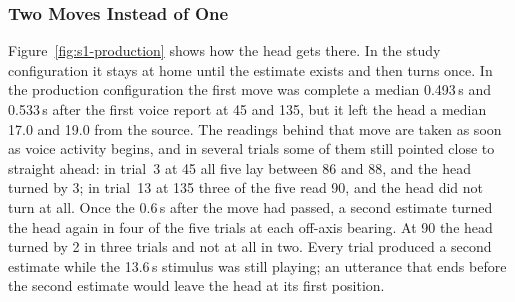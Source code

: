 \subsubsection{Two Moves Instead of One}

Figure~\ref{fig:s1-production} shows how the head gets there. In the study
configuration it stays at home until the estimate exists and then turns once.
In the production configuration the first move was complete a median 0.493\,s
and 0.533\,s after the first voice report at 45\textdegree{} and
135\textdegree{}, but it left the head a median 17.0\textdegree{} and
19.0\textdegree{} from the source. The readings behind that move are taken as
soon as voice activity begins, and in several trials some of them still pointed
close to straight ahead: in trial~3 at 45\textdegree{} all five lay between
86\textdegree{} and 88\textdegree{}, and the head turned by 3\textdegree{}; in
trial~13 at 135\textdegree{} three of the five read 90\textdegree{}, and the head
did not turn at all. Once the 0.6\,s after the move had passed, a second estimate
turned the head again in four of the five trials at each off-axis bearing. At
90\textdegree{} the head turned by 2\textdegree{} in three trials and not at all
in two. Every trial produced a second estimate while the 13.6\,s stimulus was still
playing; an utterance that ends before the second estimate would leave the head at
its first position.

